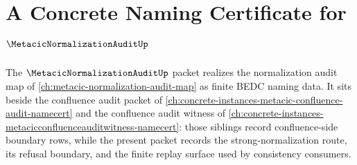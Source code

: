 \chapter{A Concrete Naming Certificate for $\MetacicNormalizationAuditUp$}
\label{ch:concrete-instances-metacicnormalizationaudit-namecert}

The $\MetacicNormalizationAuditUp$ packet realizes the normalization audit map of \autoref{ch:metacic-normalization-audit-map} as finite BEDC naming data. It sits beside the confluence audit packet of \autoref{ch:concrete-instances-metacic-confluence-audit-namecert} and the confluence audit witness of \autoref{ch:concrete-instances-metacicconfluenceauditwitness-namecert}: those siblings record confluence-side boundary rows, while the present packet records the strong-normalization route, its refusal boundary, and the finite replay surface used by consistency consumers.

